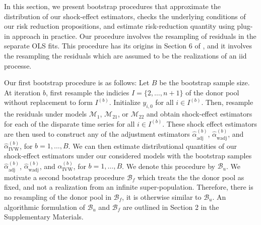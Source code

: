 \documentclass[11pt]{article}
\def\mrm#1{\mathrm{#1}} %
\def\mc#1{\mathcal{#1}} %
\theoremstyle{definition}
\begin{document}
In this section, we present bootstrap procedures that approximate the distribution of our shock-effect estimators, checks the underlying conditions of our risk reduction propositions, and estimate risk-reduction quantity using plug-in approach in practice. Our procedure involves the resampling of residuals in the separate OLS fits. This procedure has its origins in Section 6 of \citet{efron1986bootstrap}, and it involves the resampling the residuals which are assumed to be the realizations of an iid processe.

Our first bootstrap procedure is as follows: Let $B$ be the bootstrap sample size. At iteration $b$, first resample the indicies $I = \{2, \ldots, n+1\}$ of the donor pool without replacement to form $I^{(b)}$. Initialize $y_{i,0}$ for all $i \in I^{(b)}$. Then, resample the residuals under models $\mc{M}_1$, $\mc{M}_{21}$, or $\mc{M}_{22}$ and obtain shock-effect estimators for each of the disparate time series for all $i \in I^{(b)}$. These shock effect estimators are then used to construct any of the adjustment estimators $\hat{\alpha}^{(b)}_{\mrm{adj}}$, $\hat{\alpha}^{(b)}_{\mrm{wadj}}$, and $\hat{\alpha}^{(b)}_{\mrm{IVW}}$, for $b = 1,\ldots,B$. We can then estimate distributional quantities of our shock-effect estimators under our considered models with the bootstrap samples $\hat{\alpha}^{(b)}_{\mrm{adj}}$, $\hat{\alpha}^{(b)}_{\mrm{wadj}}$, and $\hat{\alpha}^{(b)}_{\mrm{IVW}}$, for $b = 1,\ldots,B$. We denote this procedure by $\mc{B}_u$. We motivate a second bootstrap procedure $\mc{B}_f$ which treats the the donor pool as fixed, and not a realization from an infinite super-population. Therefore, there is no resampling of the donor pool in $\mc{B}_f$, it is otherwise similar to $\mc{B}_u$. An algorithmic formulation of $\mc{B}_u$ and $\mc{B}_f$  are outlined in Section 2 in the Supplementary Materials.
\end{document}
